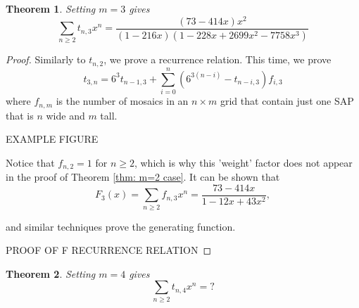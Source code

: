 \documentclass[12pt]{article}
\newtheorem{theorem}{Theorem}
\theoremstyle{plain}
\theoremstyle{definition}
\theoremstyle{remark}
\theoremstyle{definition}
\begin{document}
\begin{theorem}\label{thm: m=3 case}
Setting $m=3$ gives
\begin{equation}
    \sum_{n \geq 2}t_{n,3}x^n = \frac{(73-414x)x^2}{(1-216x)(1-228x+2699x^2-7758x^3)}
\end{equation}
\end{theorem}

\begin{proof}
Similarly to $t_{n,2}$, we prove a recurrence relation. This time, we prove
$$t_{3,n} = 6^3 t_{n-1,3} + \sum_{i = 0}^{n}(6^{3(n-i)} - t_{n-i,3})f_{i,3}$$
where $f_{n,m}$ is the number of mosaics in an $n \times m$ grid  that contain just one SAP that is $n$ wide and $m$ tall. 

EXAMPLE FIGURE %

Notice that $f_{n,2} = 1$ for $n \geq 2$, which is why this 'weight' factor does not appear in the proof of Theorem \ref{thm: m=2 case}. It can be shown that 
$$F_3(x) = \sum_{n \geq 2} f_{n,3}x^n = \frac{73 - 414x}{1-12x+43x^2},$$

and similar techniques prove the generating function.

PROOF OF F RECURRENCE RELATION

\end{proof}

\begin{theorem}
Setting $m=4$ gives
\begin{equation}
    \sum_{n \geq 2}t_{n,4}x^n = ?
\end{equation}
\end{theorem}


\printbibliography
\end{document}
